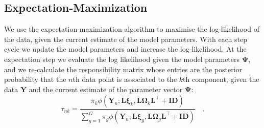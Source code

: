 \documentclass[twocolumn]{aastex61}
\newcommand{\vect}[1]{\boldsymbol{\mathbf{#1}}}
\renewcommand{\vec}[1]{\vect{#1}}
\newcommand{\weight}{\pi}
\newcommand{\data}{\textbf{Y}}
\newcommand{\vecdata}{\vec\data}
\newcommand{\transpose}{^\intercal}
\newcommand{\eye}{\textbf{I}}
\newcommand{\factorloads}{\textbf{L}}
\newcommand{\specificvariance}{\vec{D}}
\newcommand{\scoremeans}{\vec\xi}
\newcommand{\scorecovs}{\vec\Omega}
\newcommand{\numdata}{n}
\newcommand{\numcomponents}{k}
\begin{document}

\subsection{Expectation-Maximization}

We use the expectation-maximization algorithm to maximise the log-likelihood
of the data, given the current estimate of the model parameters. With each step
cycle we update the model parameters and increase the log-likelihood.
At the expectation step we evaluate the log likelihood
given the model parameters $\vec\Psi$, and we re-calculate the responsibility
matrix whose entries are the posterior probability
that the $\numdata$th data point is associated to the $\numcomponents$th component,
given the data $\vecdata$ and the current estimate of the 
parameter vector $\vec\Psi$:
\begin{equation}
	\tau_{\numdata\numcomponents} = \frac{\weight_\numcomponents\phi(\vecdata_\numdata;\factorloads\scoremeans_\numcomponents, \factorloads\scorecovs_\numcomponents\factorloads\transpose + \eye\specificvariance)}{\sum_{g=1}^{G}\weight_g\phi(\vecdata_\numdata;\factorloads\scoremeans_g, \factorloads\scorecovs_g\factorloads\transpose + \eye\specificvariance)} \quad .
\end{equation}
\end{document}
